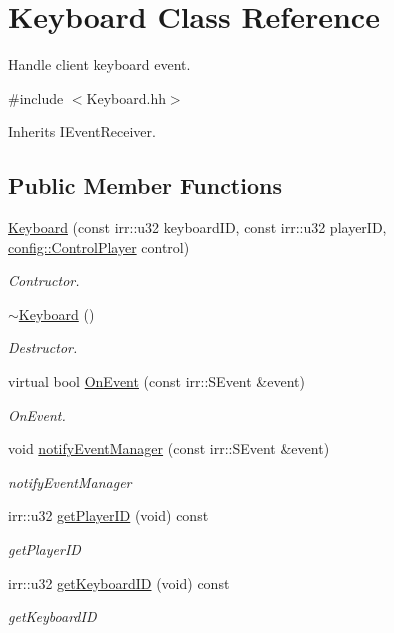 \hypertarget{classKeyboard}{}\section{Keyboard Class Reference}
\label{classKeyboard}


Handle client keyboard event.  




{\ttfamily \#include $<$Keyboard.\+hh$>$}



Inherits I\+Event\+Receiver.

\subsection*{Public Member Functions}
\begin{DoxyCompactItemize}
\item 
\hyperlink{classKeyboard_abb54d55e7d65dd6ef017352fdf5570c6}{Keyboard} (const irr\+::u32 keyboard\+ID, const irr\+::u32 player\+ID, \hyperlink{structconfig_1_1ControlPlayer}{config\+::\+Control\+Player} control)
\begin{DoxyCompactList}\small\item\em Contructor. \end{DoxyCompactList}\item 
\hyperlink{classKeyboard_af6a99ec66c8c722a45b967bf79167038}{$\sim$\+Keyboard} ()
\begin{DoxyCompactList}\small\item\em Destructor. \end{DoxyCompactList}\item 
virtual bool \hyperlink{classKeyboard_ad6974153a0c29b55c1b8765d0d6ccbfa}{On\+Event} (const irr\+::\+S\+Event \&event)
\begin{DoxyCompactList}\small\item\em On\+Event. \end{DoxyCompactList}\item 
void \hyperlink{classKeyboard_a6c6492921a44b4a4ab7e96566381353c}{notify\+Event\+Manager} (const irr\+::\+S\+Event \&event)
\begin{DoxyCompactList}\small\item\em notify\+Event\+Manager \end{DoxyCompactList}\item 
irr\+::u32 \hyperlink{classKeyboard_ac8fe530866f42dd3a62ea66054bc148b}{get\+Player\+ID} (void) const
\begin{DoxyCompactList}\small\item\em get\+Player\+ID \end{DoxyCompactList}\item 
irr\+::u32 \hyperlink{classKeyboard_a8bc4a7d865e268c0d126aa3f0a913bbb}{get\+Keyboard\+ID} (void) const
\begin{DoxyCompactList}\small\item\em get\+Keyboard\+ID \end{DoxyCompactList}\end{DoxyCompactItemize}


